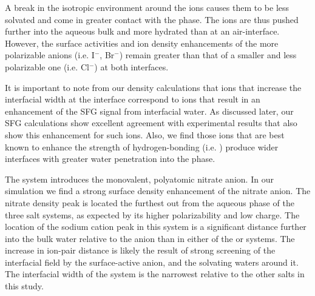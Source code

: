 
A break in the isotropic environment around the ions causes them to be less solvated and come in greater contact with the \ctc phase. The ions are thus pushed further into the aqueous bulk and more hydrated than at an air-interface. However, the surface activities and ion density enhancements of the more polarizable anions (i.e. I$^-$, Br$^-$) remain greater than that of a smaller and less polarizable one (i.e. Cl$^-$) at both interfaces. 

It is important to note from our density calculations that ions that increase the interfacial width at the \ctcwat interface correspond to ions that result in an enhancement of the SFG signal from interfacial water. As discussed later, our SFG calculations show excellent agreement with experimental results that also show this enhancement for such ions. Also, we find those ions that are best known to enhance the strength of hydrogen-bonding (i.e. \sul) produce wider interfaces with greater water penetration into the \ctc phase.

The \sodnit system introduces the monovalent, polyatomic nitrate anion. In our simulation we find a strong surface density enhancement of the nitrate anion. The nitrate density peak is located the furthest out from the aqueous phase of the three salt systems, as expected by its higher polarizability and low charge. The location of the sodium cation peak in this system is a significant distance further into the bulk water relative to the anion than in either of the \nacl or \sodsul systems. The increase in ion-pair distance is likely the result of strong screening of the interfacial field by the surface-active anion, and the solvating waters around it. The interfacial width of the \sodnit system is the narrowest relative to the other salts in this study. 


